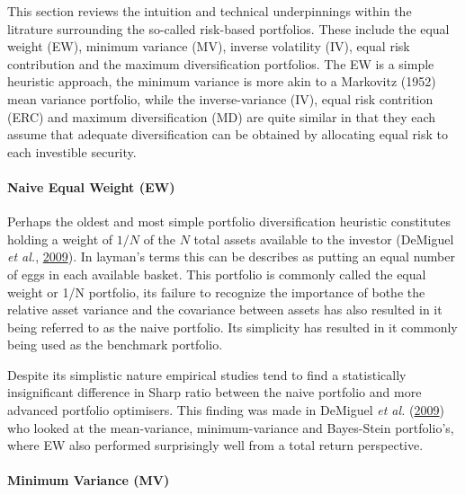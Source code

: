 \documentclass[11pt,preprint, authoryear]{elsarticle}
\numberwithin{equation}{section}
\numberwithin{figure}{section}
\numberwithin{table}{section}
\begin{document}
This section reviews the intuition and technical underpinnings within
the litrature surrounding the so-called risk-based portfolios. These
include the equal weight (EW), minimum variance (MV), inverse volatility
(IV), equal risk contribution and the maximum diversification
portfolios. The EW is a simple heuristic approach, the minimum variance
is more akin to a Markovitz (1952) mean variance portfolio, while the
inverse-variance (IV), equal risk contrition (ERC) and maximum
diversification (MD) are quite similar in that they each assume that
adequate diversification can be obtained by allocating equal risk to
each investible security.

\hypertarget{naive-equal-weight-ew}{%
\paragraph{Naive Equal Weight (EW)}\label{naive-equal-weight-ew}}

Perhaps the oldest and most simple portfolio diversification heuristic
constitutes holding a weight of \(1/N\) of the \(N\) total assets
available to the investor (DeMiguel \emph{et al.},
\protect\hyperlink{ref-demiguel2009}{2009}). In layman's terms this can
be describes as putting an equal number of eggs in each available
basket. This portfolio is commonly called the equal weight or 1/N
portfolio, its failure to recognize the importance of bothe the relative
asset variance and the covariance between assets has also resulted in it
being referred to as the naive portfolio. Its simplicity has resulted in
it commonly being used as the benchmark portfolio.

Despite its simplistic nature empirical studies tend to find a
statistically insignificant difference in Sharp ratio between the naive
portfolio and more advanced portfolio optimisers. This finding was made
in DeMiguel \emph{et al.} (\protect\hyperlink{ref-demiguel2009}{2009})
who looked at the mean-variance, minimum-variance and Bayes-Stein
portfolio's, where EW also performed surprisingly well from a total
return perspective.

\hypertarget{minimum-variance-mv}{%
\paragraph{Minimum Variance (MV)}\label{minimum-variance-mv}}
\end{document}

